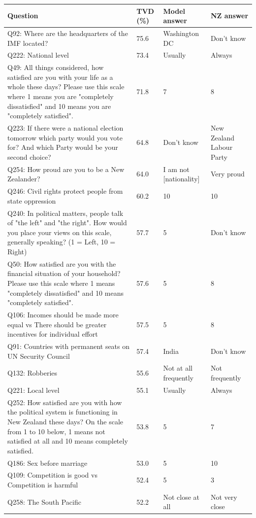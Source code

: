 \begin{tabular}{p{3.1in}lp{1.05in}p{1.05in}}
\toprule
Question & TVD (\%) & Model answer & NZ answer \\
\midrule
Q92: Where are the headquarters of the IMF located? & 75.6 & Washington DC & Don't know \\
Q222: National level & 73.4 & Usually & Always \\
Q49: All things considered, how satisfied are you with your life as a whole these days? Please use this scale where 1 means you are "completely dissatisfied" and 10 means you are "completely satisfied". & 71.8 & 7 & 8 \\
Q223: If there were a national election tomorrow which party would you vote for? And which Party would be your second choice? & 64.8 & Don't know & New Zealand Labour Party \\
Q254: How proud are you to be a New Zealander? & 64.0 & I am not [nationality] & Very proud \\
Q246: Civil rights protect people from state oppression & 60.2 & 10 & 10 \\
Q240: In political matters, people talk of "the left" and "the right". How would you place your views on this scale, generally speaking? (1 = Left, 10 = Right) & 57.7 & 5 & Don't know \\
Q50: How satisfied are you with the financial situation of your household? Please use this scale where 1 means "completely dissatisfied" and 10 means "completely satisfied". & 57.6 & 5 & 8 \\
Q106: Incomes should be made more equal vs There should be greater incentives for individual effort & 57.5 & 5 & 8 \\
Q91: Countries with permanent seats on UN Security Council & 57.4 & India & Don't know \\
Q132: Robberies & 55.6 & Not at all frequently & Not frequently \\
Q221: Local level & 55.1 & Usually & Always \\
Q252: How satisfied are you with how the political system is functioning in New Zealand these days? On the scale from 1 to 10 below, 1 means not satisfied at all and 10 means completely satisfied. & 53.8 & 5 & 7 \\
Q186: Sex before marriage & 53.0 & 5 & 10 \\
Q109: Competition is good vs Competition is harmful & 52.4 & 5 & 3 \\
Q258: The South Pacific & 52.2 & Not close at all & Not very close \\

\end{tabular}
